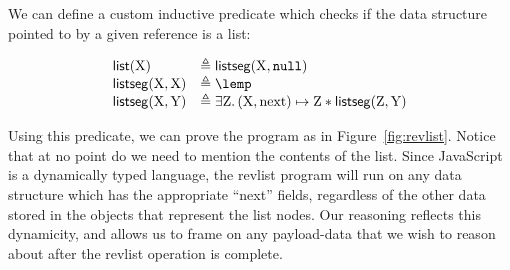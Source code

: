 \documentclass{article}
\newcommand{\iflong}[1]{#1}
\begin{document}
\iflong{We can define a custom inductive predicate which checks if the data structure pointed to by a given reference is a list:

\[
\begin{array}{ll}
        \tlist(\V{X}) & \triangleq \tlistseg(\V{X},\nil)\\
        \tlistseg(\V{X},\V{X}) & \triangleq \lemp \\
        \tlistseg(\V{X},\V{Y}) & \triangleq \exists \V{Z} \st (\V{X},\text{next})\pointsto \V{Z} \sep \tlistseg(\V{Z},\V{Y})
\end{array}
\]

Using this \tlist predicate, we can prove the \js{revlist} program as in
Figure~\ref{fig:revlist}. Notice that at no point do we need to mention the
contents of the list. Since JavaScript is a dynamically typed language, the
revlist program will run on any data structure which has the appropriate
``next'' fields, regardless of the other data stored in the objects that
represent the list nodes. Our reasoning reflects this dynamicity, and allows us
to frame on any payload-data that we wish to reason about after the revlist
operation is complete. 

}
\end{document}
